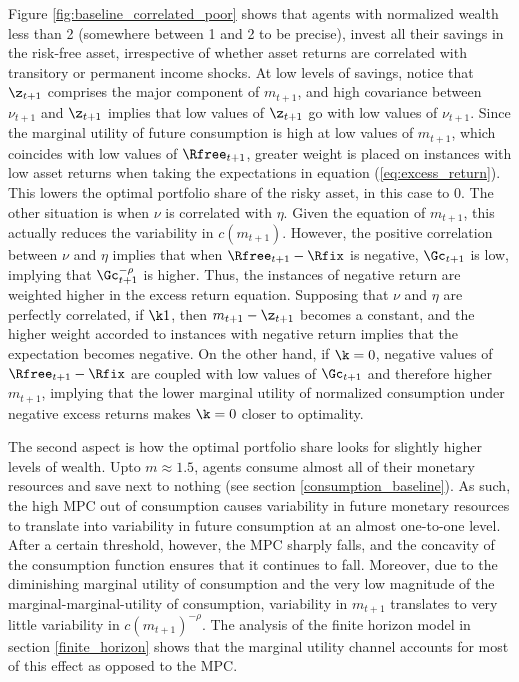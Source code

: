 Figure \ref{fig:baseline_correlated_poor} shows that agents with normalized wealth less than 2 (somewhere between 1 and 2 to be precise), invest all their savings in the risk-free asset, irrespective of whether asset returns are correlated with transitory or permanent income shocks. At low levels of savings, notice that $\z_{t+1}$ comprises the major component of $m_{t+1}$, and high covariance between $\nu_{t+1}$ and $\z_{t+1}$ implies that low values of $\z_{t+1}$ go with low values of $\nu_{t+1}$. Since the marginal utility of future consumption is high at low values of $m_{t+1}$, which coincides with low values of $\Rfree_{t+1}$, greater weight is placed on instances with low asset returns when taking the expectations in equation (\ref{eq:excess_return}). This lowers the optimal portfolio share of the risky asset, in this case to 0. The other situation is when $\nu$ is correlated with $\eta$. Given the equation of $m_{t+1}$, this actually reduces the variability in $c(m_{t+1})$. However, the positive correlation between $\nu$ and $\eta$ implies that when $\Rfree_{t+1} - \Rfix$ is negative, $\Gc_{t+1}$ is low, implying that $\Gc_{t+1}^{-\rho}$ is higher. Thus, the instances of negative return are weighted higher in the excess return equation. Supposing that $\nu$ and $\eta$ are perfectly correlated, if $\k  1$, then $m_{t+1} - \z_{t+1}$ becomes a constant, and the higher weight accorded to instances with negative return implies that the expectation becomes negative. On the other hand, if $\k = 0$, negative values of $\Rfree_{t+1} - \Rfix$ are coupled with low values of $\Gc_{t+1}$ and therefore higher $m_{t+1}$, implying that the lower marginal utility of normalized consumption under negative excess returns makes $\k = 0$ closer to optimality.

The second aspect is how the optimal portfolio share looks for slightly higher levels of wealth. Upto $m \approx 1.5$, agents consume almost all of their monetary resources and save next to nothing (see section \ref{consumption_baseline}). As such, the high MPC out of consumption causes variability in future monetary resources to translate into variability in future consumption at an almost one-to-one level. After a certain threshold, however, the MPC sharply falls, and the concavity of the consumption function ensures that it continues to fall. Moreover, due to the diminishing marginal utility of consumption and the very low magnitude of the marginal-marginal-utility of consumption, variability in $m_{t+1}$ translates to very little variability in $c(m_{t+1})^{-\rho}$. The analysis of the finite horizon model in section \ref{finite_horizon} shows that the marginal utility channel accounts for most of this effect as opposed to the MPC.

